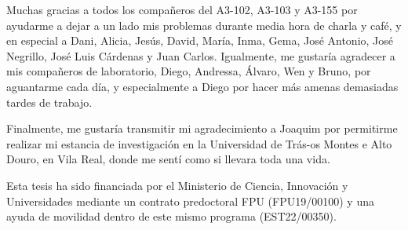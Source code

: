 \noindent Muchas gracias a todos los compañeros del A3-102, A3-103 y A3-155 por ayudarme a dejar a un lado mis problemas durante media hora de charla y café, y en especial a Dani, Alicia, Jesús, David, María, Inma, Gema, José Antonio, José Negrillo, José Luis Cárdenas y Juan Carlos. Igualmente, me gustaría agradecer a mis compañeros de laboratorio, Diego, Andressa, Álvaro, Wen y Bruno, por aguantarme cada día, y especialmente a Diego por hacer más amenas demasiadas tardes de trabajo. 

\noindent Finalmente, me gustaría transmitir mi agradecimiento a Joaquim por permitirme realizar mi estancia de investigación en la Universidad de Trás-os Montes e Alto Douro, en Vila Real, donde me sentí como si llevara toda una vida. 

\vspace{50mm} 

\noindent Esta tesis ha sido financiada por el Ministerio de Ciencia, Innovación y Universidades mediante un contrato predoctoral FPU (FPU19/00100) y una ayuda de movilidad dentro de este mismo programa (EST22/00350).  

